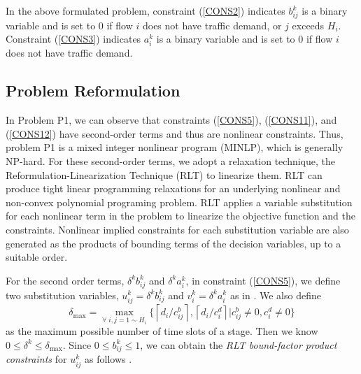 \documentclass[journal]{IEEEtran}
\begin{document}
\vbox{}

In the above formulated problem, constraint (\ref{CONS2}) indicates $b_{ij}^k$ is a binary variable
and is set to 0 if flow $i$ does not have traffic demand, or $j$ exceeds $H_i$. Constraint
(\ref{CONS3}) indicates $a_i^k$ is a binary variable and is set to 0 if flow $i$ does not have
traffic demand.
























\subsection{Problem Reformulation}\label{S4-2}

In Problem P1, we can observe that constraints (\ref{CONS5}), (\ref{CONS11}), and (\ref{CONS12})
have second-order terms and thus are nonlinear constraints. Thus, problem P1 is a mixed integer
nonlinear program (MINLP), which is generally NP-hard. For these second-order terms, we adopt a
relaxation technique, the Reformulation-Linearization Technique (RLT) \cite{RLT, mao_20} to
linearize them. RLT can produce tight linear programming relaxations for an underlying nonlinear
and non-convex polynomial programing problem. RLT applies a variable substitution for each
nonlinear term in the problem to linearize the objective function and the constraints. Nonlinear
implied constraints for each substitution variable are also generated as the products of bounding
terms of the decision variables, up to a suitable order.

For the second order terms, ${\delta ^k}  b_{ij}^k$ and ${\delta ^k} a_i^k$, in constraint
(\ref{CONS5}), we define two substitution variables, $u_{ij}^k={\delta ^k}  b_{ij}^k$ and
$v_i^k={\delta ^k} a_i^k$ as in \cite{mao}. We also define
\begin{equation}
{\delta _{\max }} = \mathop {\max }\limits_{\forall \;i,j = 1 \sim {H_i}} \{ \left\lceil
{{d_i}/c_{ij}^b} \right\rceil ,\left\lceil {{d_i}/c_i^d} \right\rceil |c_{ij}^b \ne 0,c_i^d \ne 0\}
\end{equation}
as the maximum possible number of time slots of a stage. Then we know $0 \le {\delta ^k} \le
{\delta _{\max }} $. Since $0 \le b_{ij}^k \le 1$, we can obtain the \emph{RLT bound-factor product
constraints} for $u_{ij}^k$ as follows \cite{mao}.
\end{document}
